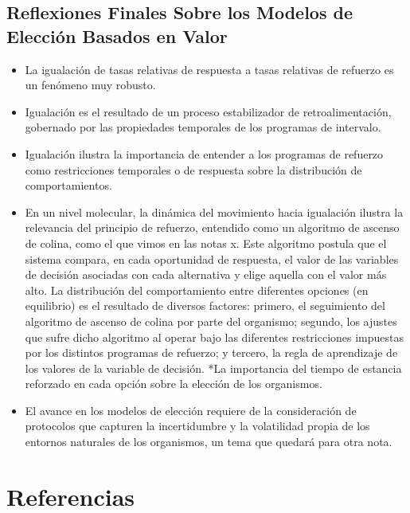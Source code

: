 \documentclass[
  a4paper,
  DIV=11,
  numbers=noendperiod]{scrreprt}
\providecommand{\tightlist}{%
  \setlength{\itemsep}{0pt}\setlength{\parskip}{0pt}}\usepackage{longtable,booktabs,array}
\newlength{\cslhangindent}
\newenvironment{CSLReferences}[2] %
 {\begin{list}{}{%
  \setlength{\itemindent}{0pt}
  \setlength{\leftmargin}{0pt}
  \setlength{\parsep}{0pt}
  \ifodd #1
   \setlength{\leftmargin}{\cslhangindent}
   \setlength{\itemindent}{-1\cslhangindent}
  \fi
  \setlength{\itemsep}{#2\baselineskip}}}
 {\end{list}}
\begin{document}
\section{Reflexiones Finales Sobre los Modelos de Elección Basados en
Valor}\label{reflexiones-finales-sobre-los-modelos-de-elecciuxf3n-basados-en-valor}

\begin{itemize}
\tightlist
\item
  La igualación de tasas relativas de respuesta a tasas relativas de
  refuerzo es un fenómeno muy robusto.
\item
  Igualación es el resultado de un proceso estabilizador de
  retroalimentación, gobernado por las propiedades temporales de los
  programas de intervalo.
\item
  Igualación ilustra la importancia de entender a los programas de
  refuerzo como restricciones temporales o de respuesta sobre la
  distribución de comportamientos.
\item
  En un nivel molecular, la dinámica del movimiento hacia igualación
  ilustra la relevancia del principio de refuerzo, entendido como un
  algoritmo de ascenso de colina, como el que vimos en las notas x. Este
  algoritmo postula que el sistema compara, en cada oportunidad de
  respuesta, el valor de las variables de decisión asociadas con cada
  alternativa y elige aquella con el valor más alto. La distribución del
  comportamiento entre diferentes opciones (en equilibrio) es el
  resultado de diversos factores: primero, el seguimiento del algoritmo
  de ascenso de colina por parte del organismo; segundo, los ajustes que
  sufre dicho algoritmo al operar bajo las diferentes restricciones
  impuestas por los distintos programas de refuerzo; y tercero, la regla
  de aprendizaje de los valores de la variable de decisión. *La
  importancia del tiempo de estancia reforzado en cada opción sobre la
  elección de los organismos.
\item
  El avance en los modelos de elección requiere de la consideración de
  protocolos que capturen la incertidumbre y la volatilidad propia de
  los entornos naturales de los organismos, un tema que quedará para
  otra nota.
\end{itemize}


\chapter*{Referencias}\label{referencias}


\label{refs}
\begin{CSLReferences}{0}{1}
\end{CSLReferences}
\end{document}

